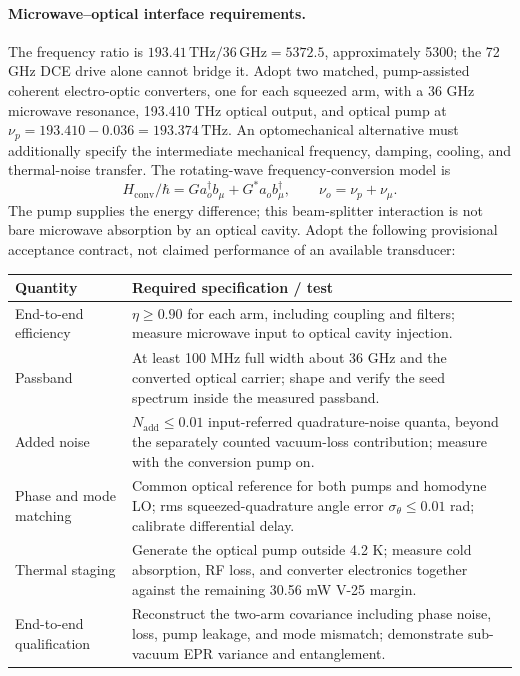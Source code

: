 \documentclass[11pt,a4paper]{article}
\newcommand{\unit}[1]{\,\mathrm{#1}}
\begin{document}
\paragraph{Microwave--optical interface requirements.}
The frequency ratio is $193.41\unit{THz}/36\unit{GHz}=5372.5$, approximately 5300;
the 72 GHz DCE drive alone cannot bridge it. Adopt two matched, pump-assisted coherent
electro-optic converters, one for each squeezed arm, with a 36 GHz microwave resonance,
193.410 THz optical output, and optical pump at
$\nu_p=193.410-0.036=193.374\unit{THz}$. An optomechanical alternative must additionally
specify the intermediate mechanical frequency, damping, cooling, and thermal-noise transfer.
The rotating-wave frequency-conversion model is~\cite{transduction}
\[
 H_{\mathrm{conv}}/\hbar=G a_o^\dagger b_\mu+G^*a_o b_\mu^\dagger,
 \qquad \nu_o=\nu_p+\nu_\mu.
\]
The pump supplies the energy difference; this beam-splitter interaction is not bare
microwave absorption by an optical cavity. Adopt the following provisional acceptance
contract, not claimed performance of an available transducer:
\begin{center}\small
\begin{tabular}{@{}P{4.1cm}P{10.7cm}@{}}\toprule
Quantity & Required specification / test\\\midrule
End-to-end efficiency & $\eta\ge0.90$ for each arm, including coupling and filters;
measure microwave input to optical cavity injection.\\
Passband & At least 100 MHz full width about 36 GHz and the converted optical carrier;
shape and verify the seed spectrum inside the measured passband.\\
Added noise & $N_{\mathrm{add}}\le0.01$ input-referred quadrature-noise quanta, beyond
the separately counted vacuum-loss contribution; measure with the conversion pump on.\\
Phase and mode matching & Common optical reference for both pumps and homodyne LO;
rms squeezed-quadrature angle error $\sigma_\theta\le0.01$ rad; calibrate differential delay.\\
Thermal staging & Generate the optical pump outside 4.2 K; measure cold absorption,
RF loss, and converter electronics together against the remaining 30.56 mW V-25 margin.\\
End-to-end qualification & Reconstruct the two-arm covariance including phase noise,
loss, pump leakage, and mode mismatch; demonstrate sub-vacuum EPR variance and entanglement.\\\bottomrule
\end{tabular}\end{center}
\end{document}
